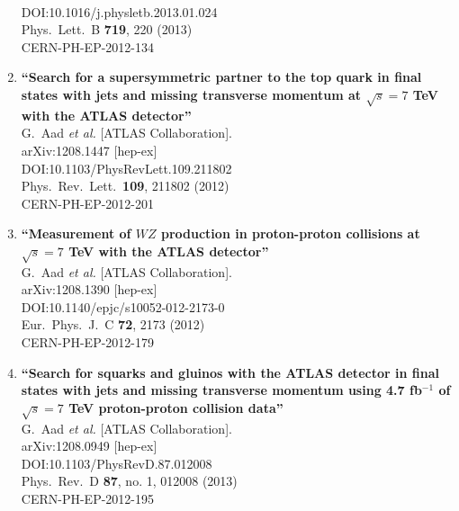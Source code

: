\documentclass{article}
\begin{document}
\begin{enumerate}
  \\{}DOI:10.1016/j.physletb.2013.01.024
  \\{}Phys.\ Lett.\ B {\bf 719}, 220 (2013)
  \\{}CERN-PH-EP-2012-134
\item%
{\bf ``Search for a supersymmetric partner to the top quark in final states with jets and missing transverse momentum at $\sqrt{s}=7$ TeV with the ATLAS detector''}
  \\{}G.~Aad {\it et al.} [ATLAS Collaboration].
  \\{}arXiv:1208.1447 [hep-ex]
  \\{}DOI:10.1103/PhysRevLett.109.211802
  \\{}Phys.\ Rev.\ Lett.\  {\bf 109}, 211802 (2012)
  \\{}CERN-PH-EP-2012-201
\item%
{\bf ``Measurement of $WZ$ production in proton-proton collisions at $\sqrt{s}=7$ TeV with the ATLAS detector''}
  \\{}G.~Aad {\it et al.} [ATLAS Collaboration].
  \\{}arXiv:1208.1390 [hep-ex]
  \\{}DOI:10.1140/epjc/s10052-012-2173-0
  \\{}Eur.\ Phys.\ J.\ C {\bf 72}, 2173 (2012)
  \\{}CERN-PH-EP-2012-179
\item%
{\bf ``Search for squarks and gluinos with the ATLAS detector in final states with jets and missing transverse momentum using 4.7 fb$^{-1}$ of $\sqrt{s}=7$ TeV proton-proton collision data''}
  \\{}G.~Aad {\it et al.} [ATLAS Collaboration].
  \\{}arXiv:1208.0949 [hep-ex]
  \\{}DOI:10.1103/PhysRevD.87.012008
  \\{}Phys.\ Rev.\ D {\bf 87}, no. 1, 012008 (2013)
  \\{}CERN-PH-EP-2012-195

\end{enumerate}
\end{document}
